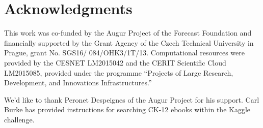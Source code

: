 \documentclass[11pt]{article}
\begin{document}
\section*{Acknowledgments}
{\footnotesize
	This work was co-funded by the Augur Project of the Forecast Foundation
and financially supported by the Grant Agency of the Czech Technical
University in Prague, grant No. SGS16/ 084/OHK3/1T/13.
Computational resources were provided by the CESNET LM2015042 and the CERIT Scientific Cloud LM2015085,
provided under the programme ``Projects of Large Research, Development, and Innovations Infrastructures.''

We'd like to thank Peronet Despeignes of the Augur Project for his support.
Carl Burke has provided instructions for searching CK-12 ebooks within
the Kaggle challenge.}



\end{document}

